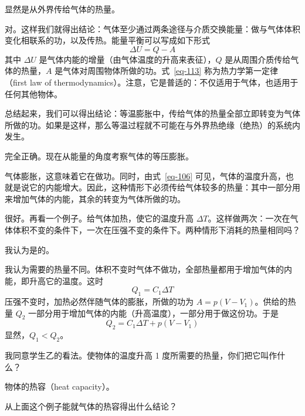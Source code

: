 \begin{dialogue}
\stdb 显然是从外界传给气体的热量。

\tchr 对。这样我们就得出结论：气体至少通过两条途径与介质交换能量：做与气体体积变化相联系的功，以及传热。能量平衡可以写成如下形式
\begin{equation}%
\Delta U = Q - A
\label{eq-113}
\end{equation}
其中 $\Delta U$ 是气体内能的增量（由气体温度的升高来表征），$Q$ 是从周围介质传给气体的热量，$A$ 是气体对周围物体所做的功。式~\eqref{eq-113} 称为热力学第一定律（first law of thermodynamics）。注意，它是普适的：不仅适用于气体，也适用于任何其他物体。

\stdb 总结起来，我们可以得出结论：等温膨胀中，传给气体的热量全部立即转变为气体所做的功。如果是这样，那么等温过程就不可能在与外界热绝缘（绝热）的系统内发生。

\tchr 完全正确。现在从能量的角度考察气体的等压膨胀。

\stdb 气体膨胀，这意味着它在做功。同时，由式~\eqref{eq-106} 可见，气体的温度升高，也就是说它的内能增大。因此，这种情形下必须传给气体较多的热量：其中一部分用来增加气体的内能，其余的转变为气体所做的功。

\tchr 很好。再看一个例子。给气体加热，使它的温度升高 $\Delta T$。这样做两次：一次在气体体积不变的条件下，一次在压强不变的条件下。两种情形下消耗的热量相同吗？

\stda 我认为是的。

\stdb 我认为需要的热量不同。体积不变时气体不做功，全部热量都用于增加气体的内能，即升高它的温度。这时
\begin{equation}%
Q_{1} = C_{1} \Delta T
\label{114}
\end{equation}
压强不变时，加热必然伴随气体的膨胀，所做的功为 $A=p(V-V_{1})$。供给的热量 $Q_{2}$ 一部分用于增加气体的内能（升高温度），一部分用于做这份功。于是
\begin{equation}%
Q_{2} = C_{1} \Delta T + p(V-V_{1})
\label{eq-115}
\end{equation}
显然，$Q_{1} < Q_{2}$。

\tchr 我同意学生乙的看法。使物体的温度升高 1 度所需要的热量，你们把它叫作什么？

\stdb 物体的热容（heat capacity）。

\tchr 从上面这个例子能就气体的热容得出什么结论？


\end{dialogue}
